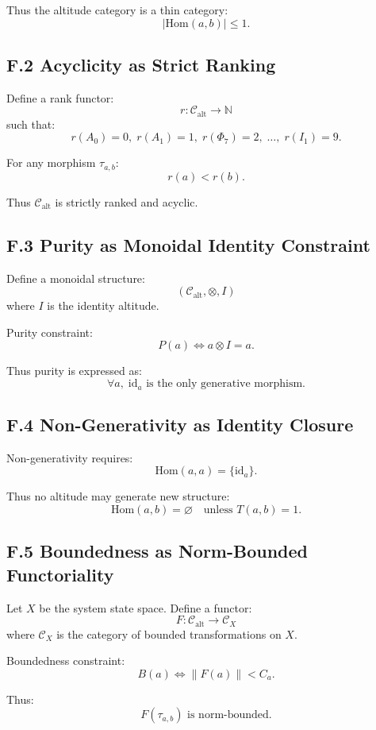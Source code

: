 Thus the altitude category is a thin category:
\[
|\mathrm{Hom}(a,b)| \le 1.
\]

\subsection*{F.2 Acyclicity as Strict Ranking}

Define a rank functor:
\[
r : \mathcal{C}_{\mathrm{alt}} \to \mathbb{N}
\]
such that:
\[
r(A_0)=0,\; r(A_1)=1,\; r(\Phi_7)=2,\; \dots,\; r(I_1)=9.
\]

For any morphism $\tau_{a,b}$:
\[
r(a) < r(b).
\]

Thus $\mathcal{C}_{\mathrm{alt}}$ is strictly ranked and acyclic.

\subsection*{F.3 Purity as Monoidal Identity Constraint}

Define a monoidal structure:
\[
(\mathcal{C}_{\mathrm{alt}}, \otimes, I)
\]
where $I$ is the identity altitude.

Purity constraint:
\[
P(a) \iff a \otimes I = a.
\]

Thus purity is expressed as:
\[
\forall a,\; \mathrm{id}_a \text{ is the only generative morphism}.
\]

\subsection*{F.4 Non-Generativity as Identity Closure}

Non-generativity requires:
\[
\mathrm{Hom}(a,a) = \{\mathrm{id}_a\}.
\]

Thus no altitude may generate new structure:
\[
\mathrm{Hom}(a,b) = \varnothing \quad \text{unless } T(a,b)=1.
\]

\subsection*{F.5 Boundedness as Norm-Bounded Functoriality}

Let $X$ be the system state space.  
Define a functor:
\[
F : \mathcal{C}_{\mathrm{alt}} \to \mathcal{C}_{X}
\]
where $\mathcal{C}_{X}$ is the category of bounded transformations on $X$.

Boundedness constraint:
\[
B(a) \iff \|F(a)\| < C_a.
\]

Thus:
\[
F(\tau_{a,b}) \text{ is norm-bounded}.
\]


